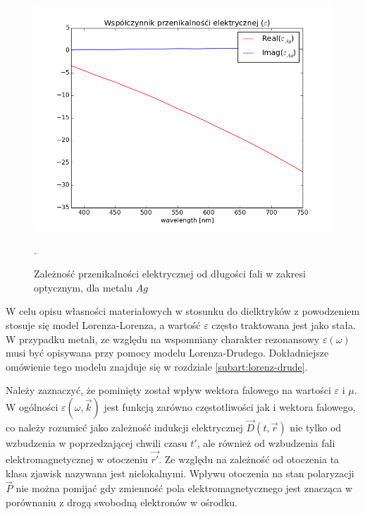 \begin{figure}[tb]
	\includegraphics[width=\textwidth]{images/agtio2eps.png}
	\caption{Zależność przenikalności elektrycznej od długości fali w zakresi optycznym, dla metalu $Ag$ \cite{PhysRevB.6.4370} }.  
	\label{fig:agtio2eps}
\end{figure}
W celu opisu własności materiałowych w stosunku do dielktryków z powodzeniem stosuje się model Lorenza-Lorenza, a wartość $\varepsilon$ często traktowana jest jako stała. W przypadku metali, ze względu na wspomniany charakter rezonansowy $\varepsilon(\omega)$  musi być opisywana przy pomocy modelu Lorenza-Drudego. Dokładniejsze omówienie tego modelu znajduje się w rozdziale \ref{subart:lorenz-drude}.

Należy zaznaczyć, że pominięty został wpływ wektora falowego na wartości $\varepsilon$ i $\mu$. W ogólności $\varepsilon(\omega,\vec{k})$ jest funkcją zarówno częstotliwości jak i wektora falowego, co należy rozumieć jako zależność indukcji elektrycznej $\vec{D}(t,\vec{r})$ nie tylko od wzbudzenia w poprzedzającej chwili czasu $t'$, ale również od wzbudzenia fali elektromagnetycznej w otoczeniu $\vec{r'}$. Ze względu na zależność od otoczenia ta klasa zjawisk nazywana jest nielokalnymi. Wpływu otoczenia na stan polaryzacji $\vec{P}$ nie można pomijać gdy zmienność pola elektromagnetycznego jest znacząca w porównaniu z drogą swobodną elektronów w ośrodku.



